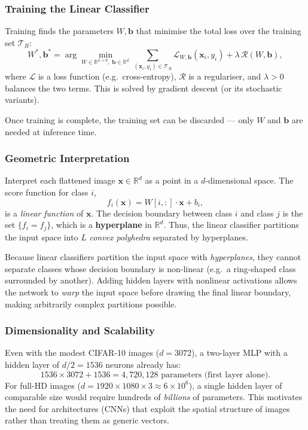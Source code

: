 \documentclass[11pt,a4paper]{article}
\begin{document}
\subsubsection{Training the Linear Classifier}

Training finds the parameters $W, \mathbf{b}$ that minimise the total loss over the training set
$\mathcal{T}_R$:
\[
  W^*, \mathbf{b}^*
  = \arg\min_{W \in \mathbb{R}^{L \times d},\; \mathbf{b} \in \mathbb{R}^L}
    \sum_{(\mathbf{x}_i, y_i) \in \mathcal{T}_R} \mathcal{L}_{W,\mathbf{b}}(\mathbf{x}_i, y_i)
    + \lambda\, \mathcal{R}(W, \mathbf{b}),
\]
where $\mathcal{L}$ is a loss function (e.g.\ cross-entropy), $\mathcal{R}$ is a regulariser,
and $\lambda > 0$ balances the two terms.  This is solved by gradient descent (or its stochastic variants).

Once training is complete, the training set can be discarded — only $W$ and $\mathbf{b}$ are needed at
inference time.

\subsubsection{Geometric Interpretation}

Interpret each flattened image $\mathbf{x} \in \mathbb{R}^d$ as a point in a $d$-dimensional space.
The score function for class $i$,
\[
  f_i(\mathbf{x}) = W[i,:]\cdot\mathbf{x} + b_i,
\]
is a \emph{linear function} of $\mathbf{x}$.  The decision boundary between class $i$ and class $j$
is the set $\{f_i = f_j\}$, which is a \textbf{hyperplane} in $\mathbb{R}^d$.  Thus, the linear
classifier partitions the input space into $L$ \emph{convex polyhedra} separated by hyperplanes.

\begin{notebox}
Because linear classifiers partition the input space with \emph{hyperplanes}, they cannot separate
classes whose decision boundary is non-linear (e.g.\ a ring-shaped class surrounded by another).
Adding hidden layers with nonlinear activations allows the network to \emph{warp} the input space
before drawing the final linear boundary, making arbitrarily complex partitions possible.
\end{notebox}

\subsubsection{Dimensionality and Scalability}

Even with the modest CIFAR-10 images ($d = 3072$), a two-layer MLP with a hidden layer of
$d/2 = 1536$ neurons already has:
\[
  1536 \times 3072 + 1536 = 4{,}720{,}128 \text{ parameters (first layer alone)}.
\]
For full-HD images ($d = 1920 \times 1080 \times 3 \approx 6 \times 10^6$), a single hidden layer
of comparable size would require hundreds of \emph{billions} of parameters.  This motivates the
need for architectures (CNNs) that exploit the spatial structure of images rather than treating them
as generic vectors.
\end{document}
